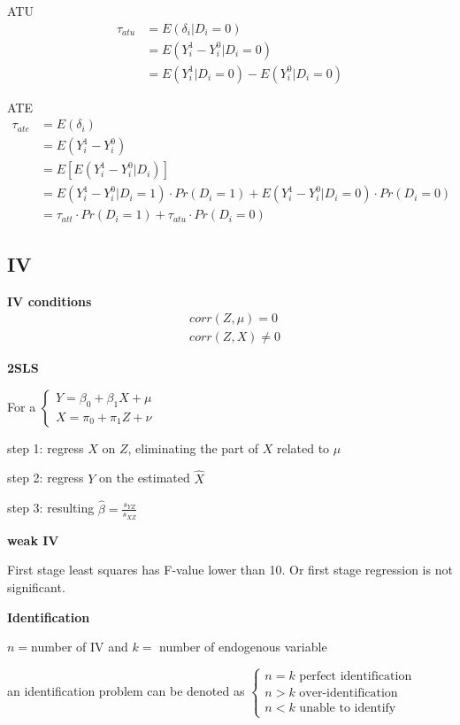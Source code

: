\documentclass{article}
\begin{document}
ATU
\begin{equation}
\begin{split}
\tau_{atu}&=E(\delta_{i}|D_{i}=0)
\\&=E(Y^{1}_{i}-Y^{0}_{i}|D_{i}=0)
\\&=E(Y^{1}_{i}|D_{i}=0)-E(Y^{0}_{i}|D_{i}=0)
\end{split}
\end{equation}

ATE
\begin{equation}
\begin{split}
\tau_{ate}&=E(\delta_{i})
\\&=E(Y^{1}_{i}-Y^{0}_{i})
\\&=E[E(Y_{i}^{1}-Y_{i}^{0}|D_{i})]
\\&=E(Y_{i}^{1}-Y_{i}^{0}|D_{i}=1)\cdot Pr(D_{i}=1)+E(Y_{i}^{1}-Y_{i}^{0}|D_{i}=0)\cdot Pr(D_{i}=0)
\\&=\tau_{att}\cdot Pr(D_{i}=1)+\tau_{atu} \cdot Pr(D_{i}=0)
\end{split}
\end{equation}

\subsection{IV}

\textbf{IV conditions}
\begin{align}
  &corr(Z,\mu)=0
  \\&corr(Z,X)\neq 0
\end{align}

\textbf{2SLS}

For a 
$\begin{cases}
Y=\beta_0+\beta_1X+\mu\\
X=\pi_0+\pi_1 Z+\nu
\end{cases}$

step 1: regress $X$ on $Z$, eliminating the part of $X$ related to $\mu$

step 2: regress $Y$ on the estimated $\hat X$

step 3: resulting $\hat{\beta}=\frac{s_{YZ}}{s_{XZ}}$


\textbf{weak IV}

First stage least squares has F-value lower than 10. Or first stage regression is not significant.



\textbf{Identification}

$n=$number of IV and $k=$ number of endogenous variable

an identification problem can be denoted as 
$\begin{cases}
  n=k \text{ perfect identification}
  \\
  n>k \text{ over-identification}
  \\
  n<k \text{ unable to identify}
\end{cases}$
\end{document}
